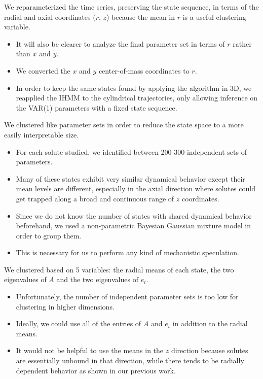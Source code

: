 \documentclass{article}
\begin{document}
  We reparameterized the time series, preserving the state sequence, in terms
  of the radial and axial coordinates ($r$, $z$) because the mean in $r$ is 
  a useful clustering variable.
  \begin{itemize}
    \item It will also be clearer to analyze the final parameter set in
    terms of $r$ rather than $x$ and $y$.
    \item We converted the $x$ and $y$ center-of-mass coordinates to $r$.
    \item In order to keep the same states found by applying the algorithm
    in 3D, we reapplied the IHMM to the cylindrical trajectories, only allowing
    inference on the VAR(1) parameters with a fixed state sequence. 
  \end{itemize} 
  
  We clustered like parameter sets in order to reduce the state space to
  a more easily interpretable size.
  \begin{itemize}
   \item For each solute studied, we identified between 200-300 independent sets of
   parameters. %
   \item Many of these states exhibit very similar dynamical behavior except their
   mean levels are different, especially in the axial direction where solutes could
   get trapped along a broad and continuous range of $z$ coordinates.
   \item Since we do not know the number of states with shared dynamical behavior
   beforehand, we used a non-parametric Bayesian Gaussian mixture model in order
   to group them. %
   \item This is necessary for us to perform any kind of mechanistic speculation.
  \end{itemize}   
 
  We clustered based on 5 variables: the radial means of each state, the two
  eigenvalues of $A$ and the two eigenvalues of $e_t$.
  \begin{itemize}
   \item Unfortunately, the number of independent parameter sets is too low for
   clustering in higher dimensions. 
   \item Ideally, we could use all of the entries of $A$ and $e_t$ in addition to 
   the radial means.
   \item It would not be helpful to use the means in the $z$ direction because solutes
   are essentially unbound in that direction, while there tends to be radially
   dependent behavior as shown in our previous work.~\cite{coscia_chemically_2019}  %
  \end{itemize}
\end{document}
